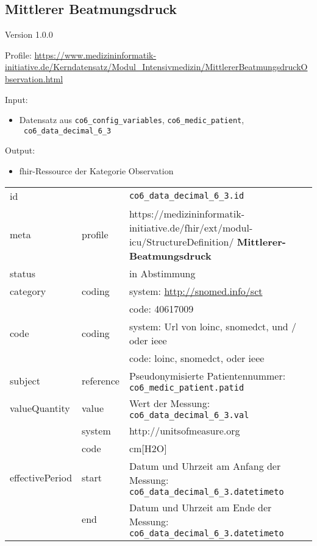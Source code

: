 \subsection{Mittlerer Beatmungsdruck} 
\noindent Version 1.0.0

\noindent Profile: \url{https://www.medizininformatik-initiative.de/Kerndatensatz/Modul_Intensivmedizin/MittlererBeatmungsdruckObservation.html}

\noindent Input:
\begin{itemize}
	\item Datensatz aus \texttt{co6\_config\_variables}, \texttt{co6\_medic\_patient}, \\ \texttt{
co6\_data\_decimal\_6\_3}
\end{itemize}
Output:
\begin{itemize}
        \item \ac{fhir}-Ressource der Kategorie \glqq Observation\grqq{}
\end{itemize}
\begin{longtable}{|l|l|p{7.5cm}|}
        \hline
        \rowcolor{lightgray} \multicolumn{3}{|l|}{Data Mapping (inhaltlich)} \\ \hline
        id &  & \texttt{co6\_data\_decimal\_6\_3.id} \\ \hline
	meta & profile & https://medizininformatik-initiative.de/fhir/ext/modul-icu/StructureDefinition/\textbf{
Mittlerer-Beatmungsdruck} \\ \hline 
	status &  & in Abstimmung  \\ \hline 
	category & coding & system: \url{http://snomed.info/sct} \\
\cline{3-3}
	& & code: 40617009 \\ \hline
	code & coding & system: Url von \ac{loinc}, \ac{snomedct}, und / oder \ac{ieee} \\ 
	\cline{3-3} 
	 &  & code: \ac{loinc}, \ac{snomedct}, oder \ac{ieee} \\ \hline
	subject & reference & Pseudonymisierte Patientennummer: \texttt{co6\_medic\_patient.patid} \\ \hline
	valueQuantity & value & Wert der Messung: \texttt{co6\_data\_decimal\_6\_3.val} \\
        \cline{2-3}
         & system & http://unitsofmeasure.org \\
         \cline{2-3}
         & code & cm[H2O] \\ \hline
    effectivePeriod & start & Datum und Uhrzeit am Anfang der Messung: \texttt{
co6\_data\_decimal\_6\_3.datetimeto} \\
    \cline{2-3}
     & end & Datum und Uhrzeit am Ende der Messung: \texttt{
co6\_data\_decimal\_6\_3.datetimeto} \\ \hline
\end{longtable}


